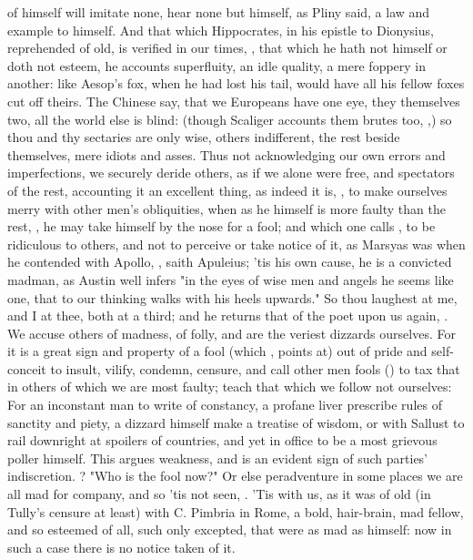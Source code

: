 of himself will imitate none, hear none
but himself, as Pliny said, a law and example to himself.
And that which Hippocrates, in his epistle to Dionysius, reprehended of old, is
verified in our times, , that which he hath not himself or doth not esteem, he
accounts superfluity, an idle quality, a mere foppery in another: like Aesop's
fox, when he had lost his tail, would have all his fellow foxes cut off theirs.
The Chinese say, that we Europeans have one eye, they themselves two, all the
world else is blind: (though Scaliger accounts them brutes
too, ,) so thou and thy sectaries are only wise, others
indifferent, the rest beside themselves, mere idiots and asses. Thus not
acknowledging our own errors and imperfections, we securely deride others, as
if we alone were free, and spectators of the rest, accounting it an excellent
thing, as indeed it is, , to make ourselves
merry with other men's obliquities, when as he himself is more faulty than the
rest, , he may take himself by the
nose for a fool; and which one calls , to be
ridiculous to others, and not to perceive or take notice of it, as Marsyas was
when he contended with Apollo, , saith
Apuleius; 'tis his own cause, he is a convicted madman, as
Austin well infers "in the eyes of wise men and angels he
seems like one, that to our thinking walks with his heels upwards." So thou
laughest at me, and I at thee, both at a third; and he returns that of the poet
upon us again, . We accuse others of madness, of folly, and are the veriest
dizzards ourselves. For it is a great sign and property of a fool (which
, points at) out of pride and self-conceit to insult,
vilify, condemn, censure, and call other men fools () to tax that in others of which we are most faulty; teach
that which we follow not ourselves: For an inconstant man to write of
constancy, a profane liver prescribe rules of sanctity and piety, a dizzard
himself make a treatise of wisdom, or with Sallust to rail downright at
spoilers of countries, and yet in office to be a most
grievous poller himself. This argues weakness, and is an evident sign of such
parties' indiscretion. ? "Who is the fool now?" Or else peradventure in some places we are all
mad for company, and so 'tis not seen, . 'Tis with us, as it was of old
(in Tully's censure at least) with C. Pimbria in Rome, a
bold, hair-brain, mad fellow, and so esteemed of all, such only excepted, that
were as mad as himself: now in such a case there is no
notice taken of it.

